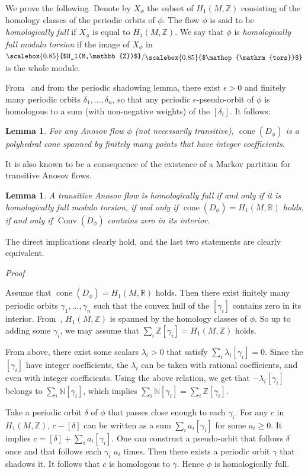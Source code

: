 \documentclass[colorinlistoftodos,12pt]{article}
\makeatletter
\newcommand{\RR}{\mathbb{R}}
\newcommand{\NN}{\mathbb{N}}
\newcommand{\ZZ}{\mathbb{Z}}
\newcommand{\bfrac}[2]{{
  \raisebox{0.1em}{\scalebox{0.85}{$#1$}}/
  \raisebox{-0.1em}{\scalebox{0.85}{$#2$}}
}}
\DeclareMathOperator{\tor}{tors}
\DeclareMathOperator{\cone}{cone}
\DeclareMathOperator{\conv}{Conv}
\theoremstyle{colorplain}
\numberwithin{theorem}{section}
\newtheorem{lemma}[theorem]{Lemma}
\theoremstyle{colorremarkbis}
\theoremstyle{colorremark}
\theoremstyle{colordefinition}
\renewenvironment{proof}[1][Proof]{
    \setcounter{claim}{0}    
    \setcounter{claimproof}{0}    
    \par
    \pushQED{\qed}%
    \normalfont\topsep6\p@\@plus6\p@\relax
    \trivlist
    \item\relax
    {\itshape\color{RoyalPurple}#1\@addpunct{.}}\hspace\labelsep\ignorespaces
}{%
    \popQED\endtrivlist\@endpefalse
}
\newcounter{claimproof} %
\makeatother
\begin{document}
We prove the following.
Denote by $X_\phi$ the subset of $H_1(M,\ZZ)$ consisting of the homology classes of the periodic orbits of $\phi$. The flow $\phi$ is said to be \emph{homologically full} if $X_\phi$ is equal to $H_1(M,\ZZ)$. We say that $\phi$ is \emph{homologically full modulo torsion} if the image of $X_\phi$ in $\bfrac{H_1(M,\ZZ)}{\tor}$ is the whole module.


From~\cite[Lemma 2.3]{marty2025partialI} and from the periodic shadowing lemma, there exist $\epsilon>0$ and finitely many periodic orbits $\delta_1,\ldots,\delta_n$, so that any periodic $\epsilon$-pseudo-orbit of $\phi$ is homologous to a sum (with non-negative weights) of the $[\delta_i]$. It follows:

\begin{lemma}
	For any Anosov flow $\phi$ (not necessarily transitive), $\cone(D_\phi)$ is a polyhedral cone spanned by finitely many points that have integer coefficients. 
\end{lemma}

It is also known to be a consequence of the existence of a Markov partition for transitive Anosov flows. 


\begin{lemma}
	A transitive Anosov flow is homologically full if and only if it is homologically full modulo torsion, if and only if $\cone(D_\phi)=H_1(M,\RR)$ holds, if and only if $\conv(D_\phi)$ contains zero in its interior.
\end{lemma}

The direct implications clearly hold, and the last two statements are clearly equivalent.

\begin{proof}
	Assume that $\cone(D_\phi)=H_1(M,\RR)$ holds.
	Then there exist finitely many periodic orbits $\gamma_1,\ldots,\gamma_n$ such that the convex hull of the $[\gamma_i]$ contains zero in its interior.
	From~\cite{adachi1987closed}, $H_1(M,\ZZ)$ is spanned by the homology classes of $\phi$. So up to adding some $\gamma_i$, we may assume that $\sum_i\ZZ[\gamma_i]=H_1(M,\ZZ)$ holds.
	
	From above, there exist some scalars $\lambda_i>0$ that satisfy $\sum_i\lambda_i[\gamma_i]=0$. Since the $[\gamma_i]$ have integer coefficients, the $\lambda_i$ can be taken with rational coefficients, and even with integer coefficients.
	Using the above relation, we get that $-\lambda_i[\gamma_i]$ belongs to $\sum_i\NN[\gamma_i]$, which implies $\sum_i\NN[\gamma_i]=\sum_i\ZZ[\gamma_i]$. 
	
	
	Take a periodic orbit $\delta$ of $\phi$ that passes close enough to each $\gamma_i$. For any $c$ in $H_1(M,\ZZ)$, $c-[\delta]$ can be written as a sum $\sum_ia_i[\gamma_i]$ for some $a_i\geq 0$. It implies $c=[\delta]+\sum_ia_i[\gamma_i]$. One can construct a pseudo-orbit that follows $\delta$ once and that follows each $\gamma_i$ $a_i$ times. Then there exists a periodic orbit $\gamma$ that shadows it. It follows that $c$ is homologous to $\gamma$. Hence $\phi$ is homologically full.
\end{proof}
\end{document}
